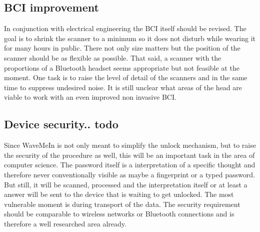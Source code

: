 \subsection{BCI improvement}
In conjunction with electrical engineering the BCI itself should be revised. The goal is to shrink the scanner to a minimum so it does not disturb while wearing it for many hours in public. There not only size matters but the position of the scanner should be as flexible as possible. That said, a scanner with the proportions of a Bluetooth headset seems appropriate but not feasible at the moment. One task is to raise the level of detail of the scanners and in the same time to suppress undesired noise. It is still unclear what areas of the head are viable to work with an even improved non invasive BCI.

\subsection{Device security.. todo}
Since WaveMeIn is not only meant to simplify the unlock mechanism, but to raise the security of the procedure as well, this will be an important task in the area of computer science. The password itself is a interpretation of a specific thought and therefore never conventionally visible as maybe a fingerprint or a typed password. But still, it will be scanned, processed and the interpretation itself or at least a answer will be sent to the device that is waiting to get unlocked. The most vulnerable moment is during transport of the data. The security requirement should be comparable to wireless networks or Bluetooth connections and is therefore a well researched area already.



